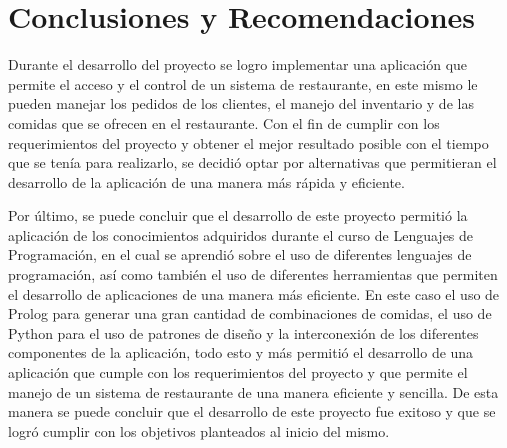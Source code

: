 \section{Conclusiones y Recomendaciones}

Durante el desarrollo del proyecto se logro implementar una 
aplicación que permite el acceso y el control de un sistema 
de restaurante, en este mismo le pueden manejar los pedidos 
de los clientes, el manejo del inventario y de las comidas
que se ofrecen en el restaurante. Con el fin de cumplir con 
los requerimientos del proyecto y obtener el mejor resultado 
posible con el tiempo que se tenía para realizarlo, se decidió 
optar por alternativas que permitieran el desarrollo de la 
aplicación de una manera más rápida y eficiente.

Por último, se puede concluir que el desarrollo de este proyecto permitió
la aplicación de los conocimientos adquiridos durante el curso de Lenguajes 
de Programación, en el cual se aprendió sobre el uso de diferentes lenguajes 
de programación, así como también el uso de diferentes herramientas que 
permiten el desarrollo de aplicaciones de una manera más eficiente. En este caso 
el uso de Prolog para generar una gran cantidad de combinaciones de comidas, 
el uso de Python para el uso de patrones de diseño y la interconexión de 
los diferentes componentes de la aplicación, todo esto y más permitió 
el desarrollo de una aplicación que cumple con los requerimientos del 
proyecto y que permite el manejo de un sistema de restaurante de una 
manera eficiente y sencilla. De esta manera se puede concluir que el 
desarrollo de este proyecto fue exitoso y que se logró cumplir con 
los objetivos planteados al inicio del mismo.
